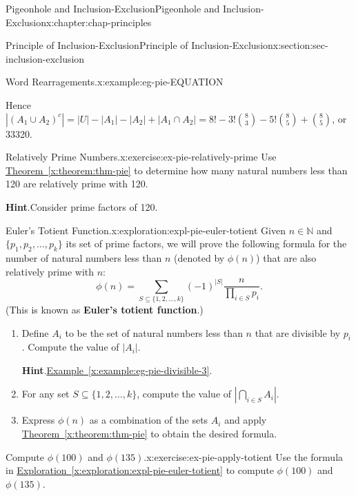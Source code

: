 \documentclass[oneside,10pt,]{book}
\newcommand{\blocktitlefont}{\relax}
\newcommand{\xreffont}{\relax}
\newcommand{\terminology}[1]{\textbf{#1}}
\numberwithin{equation}{section}
\begin{document}
\begin{chapterptx}{Pigeonhole and Inclusion-Exclusion}{}{Pigeonhole and Inclusion-Exclusion}{}{}{x:chapter:chap-principles}
\begin{sectionptx}{Principle of Inclusion-Exclusion}{}{Principle of Inclusion-Exclusion}{}{}{x:section:sec-inclusion-exclusion}
\begin{example}{Word Rearragements.}{x:example:eg-pie-EQUATION}
%
\par
Hence \(|(A_1 \cup A_2)^c| = |U| - |A_1| - |A_2| + |A_1 \cap A_2| = 8! - 3!\binom{8}{3} - 5!\binom{8}{5} + \binom{8}{5}\), or 33320.%
\end{example}
\begin{inlineexercise}{Relatively Prime Numbers.}{x:exercise:ex-pie-relatively-prime}%
Use \hyperref[x:theorem:thm-pie]{Theorem~{\xreffont\ref{x:theorem:thm-pie}}} to determine how many natural numbers less than 120 are relatively prime with 120.%
\par\smallskip%
\noindent\textbf{\blocktitlefont Hint}.\hypertarget{g:hint:id534193}{}\quad{}Consider prime factors of 120.%
\end{inlineexercise}%
\begin{exploration}{Euler's Totient Function.}{x:exploration:expl-pie-euler-totient}%
Given \(n \in \mathbb{N}\) and \(\{p_1,p_2,\ldots,p_k\}\) its set of prime factors, we will prove the following formula for the number of natural numbers less than \(n\) (denoted by \(\phi(n)\)) that are also relatively prime with \(n\):%
\begin{equation*}
\phi(n) = \sum_{S \subseteq \{1,2,\ldots,k\}}(-1)^{|S|}\dfrac{n}{\prod_{i\in S} p_i}\text{.}
\end{equation*}
(This is known as \terminology{Euler's totient function}.)%
\begin{enumerate}[font=\bfseries,label=(\alph*),ref=\alph*]
\item{}Define \(A_i\) to be the set of natural numbers less than \(n\) that are divisible by \(p_i\). Compute the value of \(|A_i|\).%
\par\smallskip%
\noindent\textbf{\blocktitlefont Hint}.\hypertarget{g:hint:id534259}{}\quad{}\hyperref[x:example:eg-pie-divisible-3]{Example~{\xreffont\ref{x:example:eg-pie-divisible-3}}}.%
\item{}For any set \(S \subseteq \{1,2,\ldots,k\}\), compute the value of \(\left|\displaystyle\bigcap_{i\in S} A_i \right|\).%
\item{}Express \(\phi(n)\) as a combination of the sets \(A_i\) and apply \hyperref[x:theorem:thm-pie]{Theorem~{\xreffont\ref{x:theorem:thm-pie}}} to obtain the desired formula.%
\end{enumerate}
\end{exploration}%
\begin{inlineexercise}{Compute \(\phi(100)\) and \(\phi(135)\).}{x:exercise:ex-pie-apply-totient}%
Use the formula in \hyperref[x:exploration:expl-pie-euler-totient]{Exploration~{\xreffont\ref{x:exploration:expl-pie-euler-totient}}} to compute \(\phi(100)\) and \(\phi(135)\).%

\end{inlineexercise}
\end{sectionptx}
\end{chapterptx}
\end{document}
